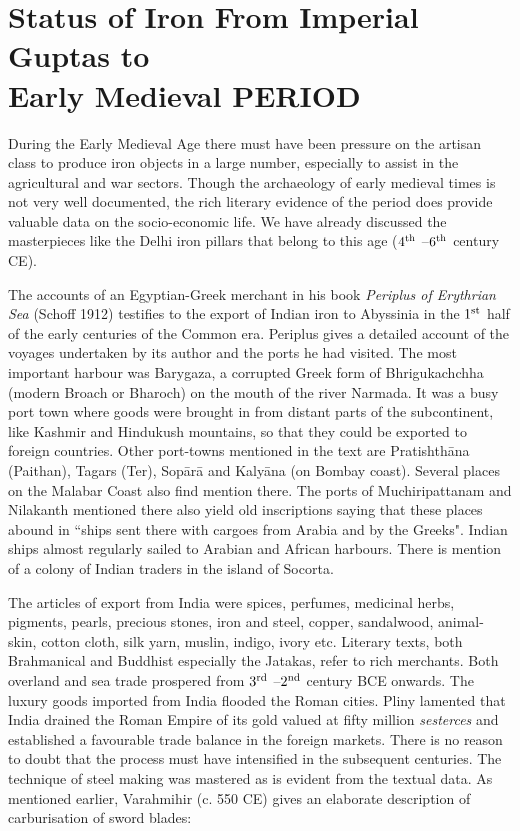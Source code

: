 \vspace{-.4cm}

\section*{Status of Iron From Imperial Guptas to\\ Early Medieval PERIOD}\label{chapter5-section-1}

\vspace{-.2cm}

During the Early Medieval Age there must have been pressure on the artisan class to produce iron objects in a large number, especially to assist in the agricultural and war sectors. Though the archaeology of early medieval times is not very well documented, the rich literary evidence of the period does provide valuable data on the socio-economic life. We have already discussed the masterpieces like the Delhi iron pillars that belong to this age ($4^{\rm th}$ –$6^{\rm th}$  century CE).

The accounts of an Egyptian-Greek merchant in his book {\it Periplus of Erythrian Sea} (Schoff 1912) testifies to the export of Indian iron to Abyssinia in the $1^{\rm st}$ half of the early centuries of the Common era. Periplus gives a detailed account of the voyages undertaken by its author and the ports he had visited. The most important harbour was Barygaza, a corrupted Greek form of Bhrigukachchha (modern Broach or Bharoch) on the mouth of the river Narmada. It was a busy port town where goods were brought in from distant parts of the subcontinent, like Kashmir and Hindukush mountains, so that they could be exported to foreign countries. Other port-towns mentioned in the text are Pratishthāna (Paithan), Tagars (Ter), Sopārā and Kalyāna (on Bombay coast). Several places on the Malabar Coast also find mention there. The ports of Muchiripattanam and Nilakanth mentioned there also yield old inscriptions saying that these places abound in ``ships sent there with cargoes from Arabia and by the Greeks". Indian ships almost regularly sailed to Arabian and African harbours. There is mention of a colony of Indian traders in the island of Socorta.

The articles of export from India were spices, perfumes, medicinal herbs, pigments, pearls, precious stones, iron and steel, copper, sandalwood, animal-skin, cotton cloth, silk yarn, muslin, indigo, ivory etc. Literary texts, both Brahmanical and Buddhist especially the Jatakas, refer to rich merchants. Both overland and sea trade prospered from $3^{\rm rd}$ –$2^{\rm nd}$ century BCE onwards. The luxury goods imported from India flooded the Roman cities. Pliny lamented that India drained the Roman Empire of its gold valued at fifty million {\it sesterces} and established a favourable trade balance in the foreign markets. There is no reason to doubt that the process must have intensified in the subsequent centuries. The technique of steel making was mastered as is evident from the textual data. As mentioned earlier, Varahmihir (c. 550 CE) gives an elaborate description of carburisation of sword blades: 

